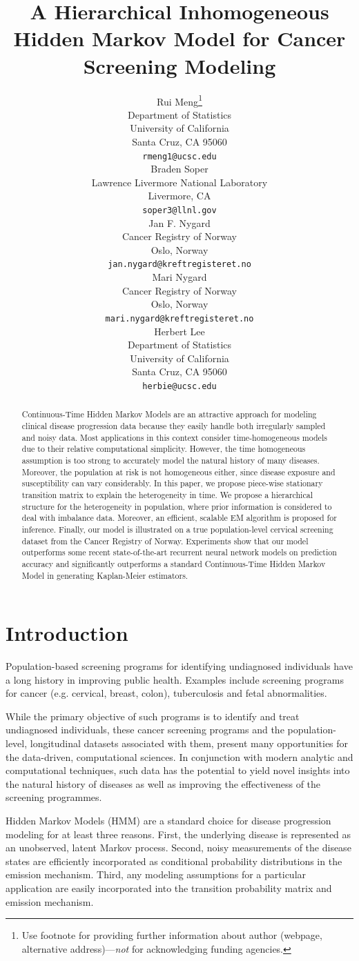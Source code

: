 \documentclass{article}
\title{A Hierarchical Inhomogeneous Hidden Markov Model for Cancer Screening Modeling}
\author{%
  Rui Meng\thanks{Use footnote for providing further information
    about author (webpage, alternative address)---\emph{not} for acknowledging
    funding agencies.} \\
  Department of Statistics\\
  University of California\\
  Santa Cruz, CA 95060 \\
  \texttt{rmeng1@ucsc.edu} \\
   \And
   Braden Soper \\
   Lawrence Livermore National Laboratory \\
   Livermore, CA \\
   \texttt{soper3@llnl.gov} \\
   \AND
   Jan F. Nygard \\
   Cancer Registry of Norway \\
   Oslo, Norway \\
   \texttt{jan.nygard@kreftregisteret.no} \\
   \And
   Mari Nygard \\
   Cancer Registry of Norway \\
   Oslo, Norway \\
   \texttt{mari.nygard@kreftregisteret.no} \\
   \And
   Herbert Lee \\
   Department of Statistics\\
   University of California\\
   Santa Cruz, CA 95060 \\
   \texttt{herbie@ucsc.edu} \\
}
\begin{document}
\maketitle

\begin{abstract}
 Continuous-Time Hidden Markov Models are an attractive approach for modeling clinical disease progression data because they easily handle both irregularly sampled and noisy data. Most applications in this context consider time-homogeneous models due to their relative computational simplicity. However, the time homogeneous assumption is too strong to accurately model the natural history of many diseases. Moreover, the population at risk is not homogeneous either, since disease exposure and susceptibility can vary considerably. In this paper, we propose piece-wise stationary transition matrix to explain the heterogeneity in time. We propose a hierarchical structure for the heterogeneity in population, where prior information is considered to deal with imbalance data. Moreover, an efficient, scalable EM algorithm is proposed for inference. Finally, our model is illustrated on a true population-level cervical screening dataset from the Cancer Registry of Norway. Experiments show that our model outperforms some recent state-of-the-art recurrent neural network models on prediction accuracy and significantly outperforms a standard Continuous-Time Hidden Markov Model in generating Kaplan-Meier estimators.
\end{abstract}

\section{Introduction}
Population-based screening programs for identifying undiagnosed individuals have a long history in improving public health. Examples include screening programs for cancer (e.g. cervical, breast, colon), tuberculosis and fetal abnormalities.  

While the primary objective of such programs is to identify and treat undiagnosed individuals, these cancer screening programs and the population-level, longitudinal datasets associated with them,  present many opportunities for the data-driven, computational sciences. 
In conjunction with modern analytic and computational techniques, such data has the potential to yield novel insights into the natural history of diseases as well as improving the effectiveness of the screening programmes. 

Hidden Markov Models (HMM) are a standard choice for disease progression modeling for at least three reasons. 
First,  the underlying disease is represented as an unobserved, latent Markov process.  
Second,  noisy measurements of the disease states are efficiently incorporated as conditional probability distributions  in the emission mechanism. 
Third, any modeling assumptions for a particular application are easily incorporated into the transition probability matrix and emission mechanism. 
\end{document}
